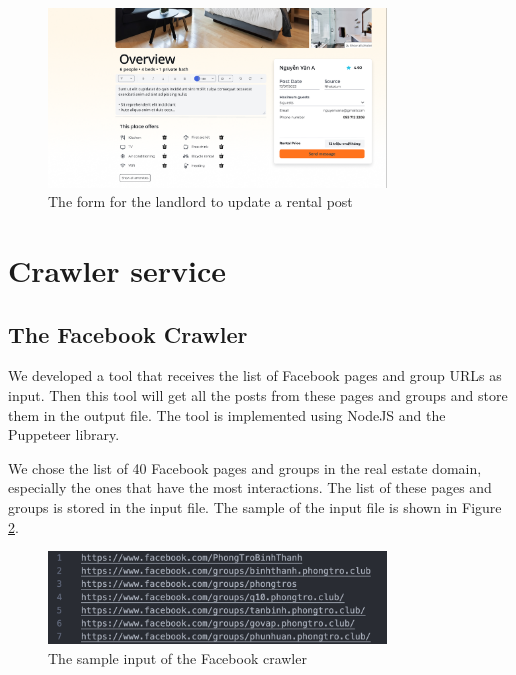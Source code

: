 \begin{figure}[ht]
    \centering
    \includegraphics[width=0.8\textwidth]{Images/Mockup/update_rental.png}
    \caption{The form for the landlord to update a rental post}
    \label{fig:update_rental}
\end{figure}

\clearpage

\section{Crawler service}

\subsection{The Facebook Crawler}
We developed a tool that receives the list of Facebook pages and group URLs as input. Then this tool will get all the posts from these pages and groups and store them in the output file. The tool is implemented using NodeJS and the Puppeteer library.

We chose the list of 40 Facebook pages and groups in the real estate domain, especially the ones that have the most interactions. The list of these pages and groups is stored in the input file. The sample of the input file is shown in Figure \ref{fig:facebook-crawler-input}.

\begin{figure}[ht]
    \centering
    \includegraphics[width=0.8\textwidth]{Images/9.Implementation/facebook_crawler_input.png}
    \caption{The sample input of the Facebook crawler}
    \label{fig:facebook-crawler-input}
\end{figure}

